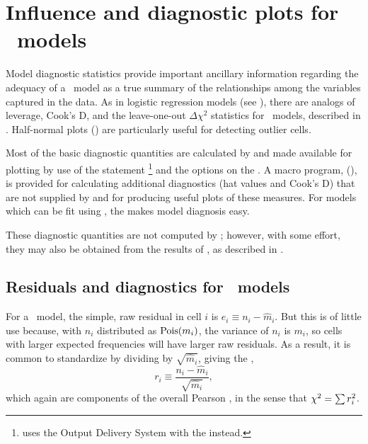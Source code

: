 \section{Influence and diagnostic plots for \loglin\ models}\label{sec:loglin-infl}

Model diagnostic statistics
provide important ancillary information regarding the adequacy of
a \loglin\ model as a true summary of the relationships among the
variables
captured in the data.
As in logistic regression models (see ),
there are analogs of leverage, Cook's D, and the
leave-one-out \(\Delta \chi^2\) statistics for \loglin\ models,
described in .
Half-normal plots ()
are particularly useful for detecting outlier cells.

Most of the basic diagnostic quantities are calculated by 
and made available for plotting by use of the statement
%
\footnote{ uses the Output Delivery System with the
 instead.}
and the options
 on the .
A macro program,  (), 
is provided for calculating
additional diagnostics (hat values and Cook's D) that are not
supplied by  and for producing useful plots of these
measures.
For models which can be fit using , the
 makes model diagnosis easy.

These diagnostic quantities are not computed by ;
however, with some effort,
they may also be obtained from the results of , as described
in .

\subsection{Residuals and diagnostics for \loglin\ models}\label{sec:loglin-resids}

For a \loglin\ model, the simple, raw residual in cell $i$ is
$e_i \equiv n_i - \widehat{m}_i$.
But this is of little use because, with $n_i$ distributed as
$\Pois ( m_i)$, the variance of $n_i$ is $m_i$,
so cells with larger expected frequencies will have larger raw
residuals.
As a result, it is common to standardize by dividing by $\sqrt{ \widehat{m}_i}$,
giving the ,
\begin{equation*}%
r_i \equiv \frac{n_i - \widehat{m}_i}{\sqrt{ \widehat{m}_i}} \comma
\end{equation*}
which again are components of the overall Pearson \chisq, in the
sense that $\chi^2 = \sum r_i^2$.

